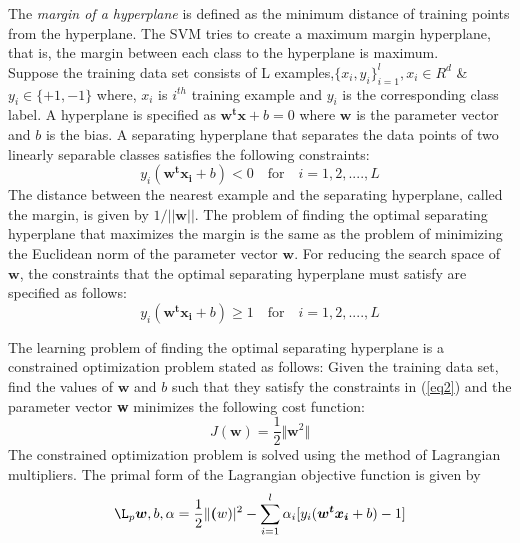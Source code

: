The \textit{margin of a hyperplane} is defined as the minimum distance of training points from the hyperplane. The SVM tries to create a maximum margin hyperplane, that is, the margin between each class to the hyperplane is maximum.\\
Suppose the training data set consists of L examples,$\lbrace x_i,y_i \rbrace_{i=1}^l, x_i \in R^d$ \& $y_i \in \lbrace +1,-1\rbrace$ where, $x_i$ is $i^{th}$ training example and $y_i$  is the corresponding class label.
A hyperplane is specified as $\boldsymbol{w^tx}+b=0$ where $\boldsymbol{w}$ is the parameter vector and $b$ is the bias. A separating hyperplane that separates the data points of two linearly separable classes satisfies the following constraints:
\begin{equation}
y_i( \boldsymbol{w^tx_i} + b) < 0 \quad \textrm{for} \quad i = 1, 2,...., L 
\end{equation}
The distance between the nearest example and the separating hyperplane, called the margin, is given by $1/||\boldsymbol{w}||$. The problem of finding the optimal separating hyperplane that maximizes the margin is the same as the problem of minimizing the Euclidean norm of the parameter vector $\boldsymbol{w}$. For reducing the search space of $\boldsymbol{w}$, the constraints that the optimal separating hyperplane must satisfy are specified as follows:
\begin{equation}\label{eq2}
y_i( \boldsymbol{w^tx_i} + b) \geq 1 \quad \textrm{for} \quad i = 1, 2,...., L 
\end{equation}

The learning problem of finding the optimal separating hyperplane is a constrained optimization problem stated as follows: Given the training data set, find the values of $\boldsymbol{w}$ and $b$ such that they satisfy the constraints in (\ref{eq2}) and the parameter vector \textbf{w} minimizes the following cost function:
\begin{equation}
J (\boldsymbol{w})=\frac{1}{2} \Vert \boldsymbol{w}^2 \Vert
 \end{equation}
The constrained optimization problem is solved using the method of Lagrangian multipliers. The primal form of the Lagrangian objective function is given by
\begin{equation}\label{Primal}
\L_p{\boldsymbol{w},b,\alpha} = \frac{1}{2}\Vert \boldsymbol(w) \vert^2 - \sum_{i=1}^l\alpha_i[y_i( \boldsymbol{w^tx_i} + b) -1]
\end{equation}

